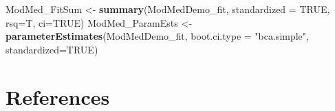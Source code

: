 \documentclass[
  11pt,
]{book}
\newenvironment{Shaded}{\begin{snugshade}}{\end{snugshade}}
\newcommand{\AttributeTok}[1]{\textcolor[rgb]{0.27,0.27,0.27}{#1}}
\newcommand{\ConstantTok}[1]{\textcolor[rgb]{0.37,0.37,0.37}{#1}}
\newcommand{\FunctionTok}[1]{\textcolor[rgb]{0.27,0.27,0.27}{\textbf{#1}}}
\newcommand{\NormalTok}[1]{#1}
\newcommand{\OtherTok}[1]{\textcolor[rgb]{0.37,0.37,0.37}{#1}}
\newcommand{\StringTok}[1]{\textcolor[rgb]{0.5,0.5,0.5}{#1}}
\begin{document}
\begin{Shaded}
\begin{Highlighting}[]
\NormalTok{ModMed\_FitSum }\OtherTok{\textless{}{-}} \FunctionTok{summary}\NormalTok{(ModMedDemo\_fit, }\AttributeTok{standardized =} \ConstantTok{TRUE}\NormalTok{, }\AttributeTok{rsq=}\NormalTok{T, }\AttributeTok{ci=}\ConstantTok{TRUE}\NormalTok{)    }
\NormalTok{ModMed\_ParamEsts }\OtherTok{\textless{}{-}} \FunctionTok{parameterEstimates}\NormalTok{(ModMedDemo\_fit, }\AttributeTok{boot.ci.type =} \StringTok{"bca.simple"}\NormalTok{, }\AttributeTok{standardized=}\ConstantTok{TRUE}\NormalTok{)}
\end{Highlighting}
\end{Shaded}

\hypertarget{refs}{%
\chapter*{References}\label{refs}}


  
\end{document}
